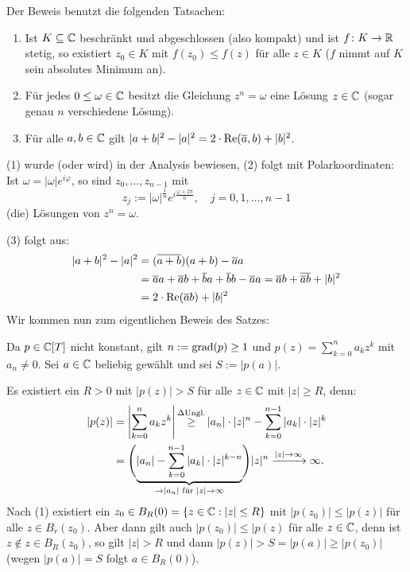 \begin{beweis}
	Der Beweis benutzt die folgenden Tatsachen:
	\begin{enumerate}[(1)]
		\item Ist $K \subseteq \mathbb{C}$ beschränkt und abgeschlossen (also kompakt) und ist $f \colon K \rightarrow \mathbb{R}$ stetig, so existiert $z_0 \in K$ mit $f(z_0) \leq f(z)$ für alle $z \in K$ ($f$ nimmt auf $K$ sein absolutes Minimum an).
		\item Für jedes $0 \leq \omega \in \mathbb{C}$ besitzt die Gleichung $z^n = \omega$ eine Lösung $z \in \mathbb{C}$ (sogar genau $n$ verschiedene Lösung).
		\item Für alle $a,b \in \mathbb{C}$ gilt $|a+b|^2 - |a|^2 = 2 \cdot \operatorname{Re}(\overline{a},b)+|b|^2$.
	\end{enumerate}
	(1) wurde (oder wird) in der Analysis bewiesen, (2) folgt mit Polarkoordinaten:
	Ist $\omega = |\omega|e^{i\varphi}$, so sind $z_0,\dots,z_{n-1}$ mit
	\[
		z_j := |\omega|^{\frac{1}{n}} e^{i \frac{\varphi+2\pi}{n}}, \quad j=0,1,\dots,n-1
	\]
	(die) Lösungen von $z^n = \omega$.
	
	(3) folgt aus:
	\begin{align*}
		|a+b|^2 - |a|^2 &= (\overline{a+b})(a+b) - \overline{a}a \\
		&= \overline{a}a + \overline{a}b + \overline{b}a + \overline{b}b - \overline{a}a = \overline{a}b + \overline{\overline{a}b} + |b|^2 \\
		&=2 \cdot \operatorname{Re}(\overline{a}b) + |b|^2
	\end{align*}
	Wir kommen nun zum eigentlichen Beweis des Satzes:
	
	Da $p \in \mathbb{C}[T]$ nicht konstant, gilt $n := \operatorname{grad}(p) \geq 1$ und $p(z) = \sum_{k=0}^{n} a_kz^k$ mit $a_n \neq 0$.
	Sei $a \in \mathbb{C}$ beliebig gewählt und sei $S:= |p(a)|$.
	
	Es existiert ein $R > 0$ mit $|p(z)|> S$ für alle $z \in \mathbb{C}$ mit $|z| \geq R$, denn:
	\begin{align*}
		|p(z)| &= \abs*{\sum_{k=0}^{n} a_k z^{k}} \stack{\Delta\text{Ungl.}}{\geq} |a_n| \cdot |z|^n - \sum_{k=0}^{n-1} |a_k| \cdot |z|^k \\
		&= \Bigg(\Underbrace{|a_n| - \sum_{k=0}^{n-1} |a_k| \cdot |z|^{k-n}}{\rightarrow |a_n| \text{ für } |z| \rightarrow \infty}\Bigg) |z|^n \xrightarrow{|z|\rightarrow \infty} \infty.
	\end{align*}
	Nach (1) existiert ein $z_0 \in B_R(0) = \{z \in \mathbb{C} : |z| \leq R\}$ mit $|p(z_0)| \leq |p(z)|$ für alle $z \in B_r(z_0)$.
	Aber dann gilt auch $|p(z_0)| \leq |p(z)$ für alle $z \in \mathbb{C}$, denn ist $z \notin z \in B_R(z_0)$, so gilt $|z|>R$ und dann $|p(z)| > S = |p(a)| \geq |p(z_0)|$ (wegen $|p(a)| = S$ folgt $a \in B_R(0)$).
	

\end{beweis}
